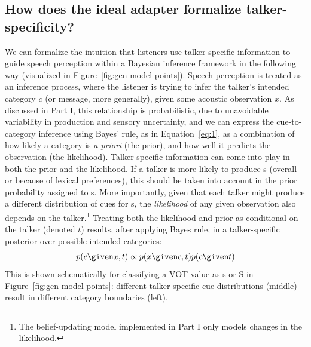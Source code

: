 \subsection{How does the ideal adapter formalize talker-specificity?}
\label{sec:how-does-ideal-adapter-talker-spec}

We can formalize the intuition that listeners use talker-specific information to guide speech perception within a Bayesian inference framework in the following way (visualized in Figure~\ref{fig:gen-model-points}).  Speech perception is treated as an inference process, where the listener is trying to infer the talker's intended category $c$ (or message, more generally), given some acoustic observation $x$.  As discussed in Part I, this relationship is probabilistic, due to unavoidable variability in production and sensory uncertainty, and we can express the cue-to-category inference using Bayes' rule, as in Equation~\eqref{eq:1}, as a combination of how likely a category is \emph{a priori} (the prior), and how well it predicts the observation (the likelihood).  Talker-specific information can come into play in both the prior and the likelihood.  If a talker is more likely to produce \ph s (overall or because of lexical preferences), this should be taken into account in the prior probability assigned to \ph s.  More importantly, given that each talker might produce a different distribution of cues for \ph s, the \emph{likelihood} of any given observation also depends on the talker.\footnote{The belief-updating model implemented in Part I only models changes in the likelihood.} Treating both the likelihood and prior as conditional on the talker (denoted $t$) results, after applying Bayes rule, in a talker-specific posterior over possible intended categories: 
\begin{equation}
  \label{eq:23}
  p(c \given x, t) \propto p(x \given c, t) p(c \given t)
\end{equation}
This is shown schematically for classifying a VOT value as \ph s or \ph S in Figure~\ref{fig:gen-model-points}: different talker-specific cue distributions (middle) result in different category boundaries (left).

